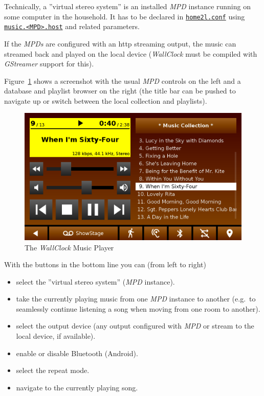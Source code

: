 \documentclass[12pt,english,parskip=half]{scrreprt}
\newcommand{\idx}[1]{#1\index{#1}}
\newcommand{\envref}[1]{\hyperref[env:#1]{\texttt{#1}}}        %
\newcommand{\toolref}[1]{\hyperref[tool:#1]{\texttt{\idx{#1}}}}
\begin{document}
Technically, a ''virtual stereo system'' is an installed \emph{MPD}
instance running on some computer in the household. It has to be
declared in \toolref{home2l.conf} using \envref{music.<MPD>.host}
and related parameters.

If the \emph{MPDs} are configured with an http streaming output, the
music can streamed back and played on the local device (\emph{WallClock}
must be compiled with \emph{GStreamer} support for this).

Figure~\ref{fig:screen-wallclock-music} shows a screenshot
with the usual \emph{MPD} controls on the left and a database and
playlist browser on the right (the title bar can be pushed to navigate 
up or switch between the local collection and playlists).


\begin{figure}[ht]
  \centering
  \includegraphics[width=0.7\linewidth]{figs/screen-wallclock-music.png}
  \caption[l]{The \emph{WallClock} Music Player}
  \label{fig:screen-wallclock-music}
\end{figure}


With the buttons in the bottom line you can (from left to right)

\begin{itemize}
\item
  select the ''virtual stereo system'' (\emph{MPD} instance).
\item
  take the currently playing music from one \emph{MPD} instance to another 
  (e.g.~to seamlessly continue listening a song when moving from one room to another).
\item
  select the output device (any output configured with \emph{MPD} or
  stream to the local device, if available).
\item
  enable or disable Bluetooth (Android).
\item
  select the repeat mode.
\item
  navigate to the currently playing song.
\end{itemize}
\end{document}
